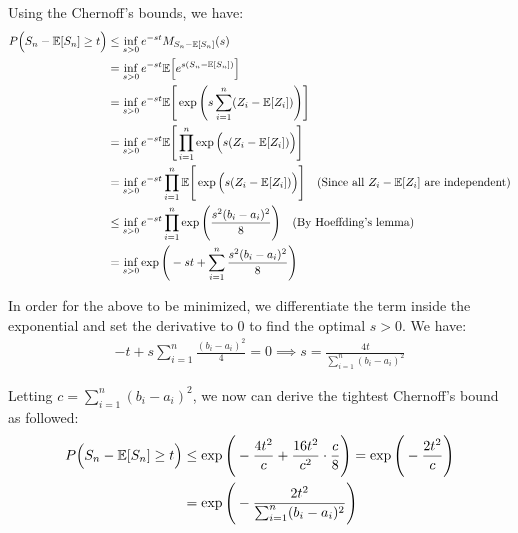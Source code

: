 \begin{proof*}
    Using the Chernoff's bounds, we have:
    \begin{align*}
        P\Big( S_n - \mathbb{E}[S_n] \ge t \Big)
            &\le \inf_{s>0} e^{-st}M_{S_n - \mathbb{E}[S_n]}(s) \\
            &= \inf_{s>0}e^{-st}\mathbb{E}\Big[ 
                e^{s(S_n - \mathbb{E}[S_n])}
             \Big] \\
            &= \inf_{s>0}e^{-st}\mathbb{E}\Bigg[ 
                \exp\Bigg( 
                    s\sum_{i=1}^n (Z_i - \mathbb{E}[Z_i])
                 \Bigg)
             \Bigg] \\
            &= \inf_{s>0}e^{-st}\mathbb{E}\Bigg[ 
                \prod_{i=1}^n \exp\Big( s( Z_i - \mathbb{E}[Z_i])  \Big)
             \Bigg] \\
            &= \inf_{s>0}e^{-st} \prod_{i=1}^n \mathbb{E}\Bigg[ 
                \exp\Big( s( Z_i - \mathbb{E}[Z_i])  \Big)
             \Bigg] \ \ \ (\text{Since all $Z_i - \mathbb{E}[Z_i]$ are independent}) \\
            &\le \inf_{s>0}e^{-st} \prod_{i=1}^n \exp\Bigg( 
                \frac{s^2(b_i - a_i)^2}{8}
             \Bigg) \ \ \ (\text{By Hoeffding's lemma}) \\
            &= \inf_{s>0} \exp\Bigg( 
                -st + \sum_{i=1}^n \frac{s^2(b_i - a_i)^2}{8}
             \Bigg)
    \end{align*}

    \noindent In order for the above to be minimized, we differentiate the term inside the exponential and set the derivative to $0$ to find the optimal $s>0$. We have:
    \begin{align*}
        -t + s\sum_{i=1}^n \frac{(b_i-a_i)^2}{4} = 0 \implies s = \frac{4t}{\sum_{i=1}^n(b_i - a_i)^2}
    \end{align*}

    \noindent Letting $c = \sum_{i=1}^n(b_i-a_i)^2$, we now can derive the tightest Chernoff's bound as followed:
    \begin{align*}
        P\Big( S_n - \mathbb{E}[S_n] \ge t \Big)
            &\le \exp\Bigg( 
                -\frac{4t^2}{c} + \frac{16t^2}{c^2} \cdot \frac{c}{8}
             \Bigg) = \exp\Bigg( 
                -\frac{2t^2}{c}
             \Bigg) \\
            &= \exp\Bigg( 
                -\frac{2t^2}{\sum_{i=1}^n(b_i - a_i)^2}
             \Bigg)
    \end{align*}


\end{proof*}

